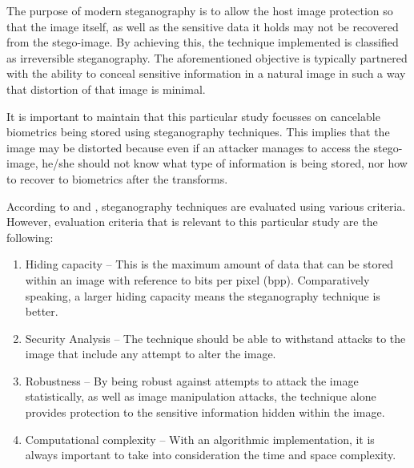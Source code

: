 The purpose of modern steganography is to allow the host image protection so that the image itself, as well as the sensitive data it holds may not be recovered from the stego-image. By achieving this, the technique implemented is classified as irreversible steganography. The aforementioned objective is typically partnered with the ability to conceal sensitive information in a natural image in such a way that distortion of that image is minimal.

It is important to maintain that this particular study focusses on cancelable biometrics being stored using steganography techniques. This implies that the image may be distorted because even if an attacker manages to access the stego-image, he/she should not know what type of information is being stored, nor how to recover to biometrics after the transforms. 

According to \cite{Jain2016} and \cite{Pradhan2016}, steganography techniques are evaluated using various criteria. However, evaluation criteria that is relevant to this particular study are the following:

\begin{enumerate}[label=\roman*.]
	
	\item Hiding capacity – This is the maximum amount of data that can be stored within an image with reference to bits per pixel (bpp). Comparatively speaking, a larger hiding capacity means the steganography technique is better.
	
	\item Security Analysis – The technique should be able to withstand attacks to the image that include any attempt to alter the image.
	
	\item Robustness – By being robust against attempts to attack the image statistically, as well as image manipulation attacks, the technique alone provides protection to the sensitive information hidden within the image. 
	
	\item Computational complexity – With an algorithmic implementation, it is always important to take into consideration the time and space complexity.

\end{enumerate}
	
